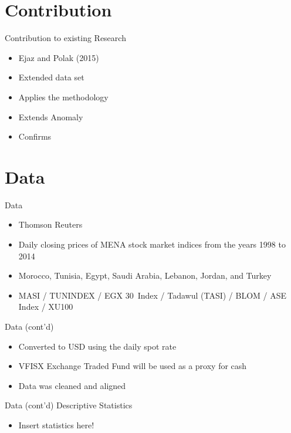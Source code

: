 \documentclass{beamer}
\begin{document}
\section{Contribution}
\begin{frame}{Contribution to existing Research}
	\begin{itemize}
\item Ejaz and Polak (2015)
\item Extended data set
\item Applies the methodology
\item Extends Anomaly
\item Confirms
	\end{itemize}
\end{frame}

\section{Data}
\begin{frame}{Data}
	\begin{itemize}
		\item Thomson Reuters
		\item Daily closing prices of MENA stock market indices from the years 1998 to 2014
		\item Morocco, Tunisia, Egypt, Saudi Arabia, Lebanon, Jordan, and Turkey
		\item MASI / TUNINDEX / EGX 30 Index / Tadawul (TASI) / BLOM / ASE Index / XU100  
	\end{itemize}
\end{frame}

\begin{frame}{Data (cont'd)}
	\begin{itemize}
		\item Converted to USD using the daily spot rate
		\item VFISX Exchange Traded Fund will be used as a proxy for cash
		\item Data was cleaned and aligned 		
	\end{itemize}
\end{frame}

\begin{frame}{Data (cont'd)}
	Descriptive Statistics
	\begin{itemize}
		\item Insert statistics here!
	\end{itemize}
\end{frame}

\end{document}
